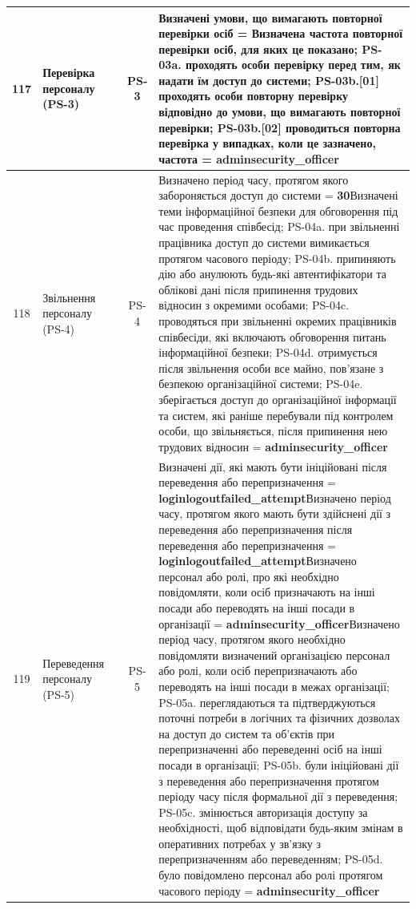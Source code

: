 \documentclass[10pt]{article}
\begin{document}
\begin{longtable}{|c|>{\raggedright\arraybackslash}p{2.5cm}|>{\raggedright\arraybackslash}p{4.5cm}|c|>{\raggedright\arraybackslash}p{4.5cm}|}
117 & Перевірка персоналу (PS-3) &  & PS-3 & Визначені умови, що вимагають повторної перевірки осіб = \textbf{}\newline Визначена частота повторної перевірки осіб, для яких це показано; PS-03a. проходять особи перевірку перед тим, як надати їм доступ до системи; PS-03b.[01] проходять особи повторну перевірку відповідно до умови, що вимагають повторної перевірки; PS-03b.[02] проводиться повторна перевірка у випадках, коли це зазначено, частота = \textbf{adminsecurity\_\allowbreak{}officer} \\ \hline
118 & Звільнення персоналу (PS-4) &  & PS-4 & Визначено період часу, протягом якого забороняється доступ до системи = \textbf{30}\newline Визначені теми інформаційної безпеки для обговорення під час проведення співбесід; PS-04a. при звільненні працівника доступ до системи вимикається протягом часового періоду; PS-04b. припиняють дію або анулюють будь-які автентифікатори та облікові дані після припинення трудових відносин з окремими особами; PS-04c. проводяться при звільненні окремих працівників співбесіди, які включають обговорення питань інформаційної безпеки; PS-04d. отримується після звільнення особи все майно, пов'язане з безпекою організаційної системи; PS-04e. зберігається доступ до організаційної інформації та систем, які раніше перебували під контролем особи, що звільняється, після припинення нею трудових відносин = \textbf{adminsecurity\_\allowbreak{}officer} \\ \hline
119 & Переведення персоналу (PS-5) &  & PS-5 & Визначені дії, які мають бути ініційовані після переведення або перепризначення = \textbf{loginlogoutfailed\_\allowbreak{}attempt}\newline Визначено період часу, протягом якого мають бути здійснені дії з переведення або перепризначення після переведення або перепризначення = \textbf{loginlogoutfailed\_\allowbreak{}attempt}\newline Визначено персонал або ролі, про які необхідно повідомляти, коли осіб призначають на інші посади або переводять на інші посади в організації = \textbf{adminsecurity\_\allowbreak{}officer}\newline Визначено період часу, протягом якого необхідно повідомляти визначений організацією персонал або ролі, коли осіб перепризначають або переводять на інші посади в межах організації; PS-05a. переглядаються та підтверджуються поточні потреби в логічних та фізичних дозволах на доступ до систем та об'єктів при перепризначенні або переведенні осіб на інші посади в організації; PS-05b. були ініційовані дії з переведення або перепризначення протягом періоду часу після формальної дії з переведення; PS-05c. змінюється авторизація доступу за необхідності, щоб відповідати будь-яким змінам в оперативних потребах у зв'язку з перепризначенням або переведенням; PS-05d. було повідомлено персонал або ролі протягом часового періоду = \textbf{adminsecurity\_\allowbreak{}officer} \\ \hline

\end{longtable}
\end{document}
